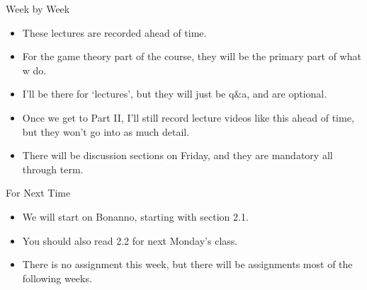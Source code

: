 \documentclass[
  ignorenonframetext,
]{beamer}
\providecommand{\tightlist}{%
  \setlength{\itemsep}{0pt}\setlength{\parskip}{0pt}}
\begin{document}
\begin{frame}{Week by Week}
\protect\hypertarget{week-by-week}{}
\begin{itemize}[<+->]
\tightlist
\item
  These lectures are recorded ahead of time.
\item
  For the game theory part of the course, they will be the primary part
  of what w do.
\item
  I'll be there for `lectures', but they will just be q\&a, and are
  optional.
\item
  Once we get to Part II, I'll still record lecture videos like this
  ahead of time, but they won't go into as much detail.
\item
  There will be discussion sections on Friday, and they are mandatory
  all through term.
\end{itemize}
\end{frame}

\begin{frame}{For Next Time}
\protect\hypertarget{for-next-time}{}
\begin{itemize}
\tightlist
\item
  We will start on Bonanno, starting with section 2.1.
\item
  You should also read 2.2 for next Monday's class.
\item
  There is no assignment this week, but there will be assignments most
  of the following weeks.
\end{itemize}
\end{frame}
\end{document}
